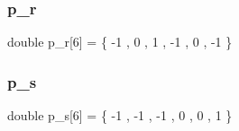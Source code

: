 \subsubsection{\texorpdfstring{p\+\_\+r}{p\_r}}
{\footnotesize\ttfamily double p\+\_\+r\mbox{[}6\mbox{]} = \{ -\/1 , 0 , 1 , -\/1 , 0 , -\/1 \}}

\mbox{\label{a00509_abd6b88b486d17d00eeac3a5cb31cda5a}} 
\subsubsection{\texorpdfstring{p\+\_\+s}{p\_s}}
{\footnotesize\ttfamily double p\+\_\+s\mbox{[}6\mbox{]} = \{ -\/1 , -\/1 , -\/1 , 0 , 0 , 1 \}}

